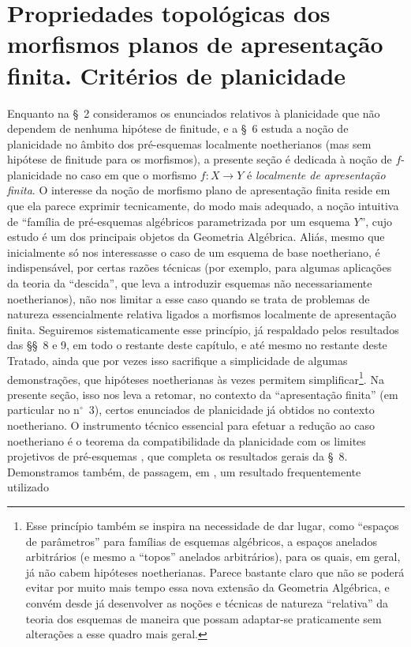 \section{Propriedades topológicas dos morfismos planos de apresentação finita. Critérios de planicidade}
\label{section:IV.11}

Enquanto na \S~2 consideramos os enunciados relativos à planicidade que não dependem de nenhuma hipótese de finitude, e a \S~6 estuda a noção de planicidade no âmbito dos pré-esquemas localmente noetherianos (mas sem hipótese de finitude para os morfismos), a presente seção é dedicada à noção de $f$-planicidade no caso em que o morfismo $f:X\to Y$ é \emph{localmente de apresentação finita}.
O interesse da noção de morfismo plano de apresentação finita reside em que ela parece exprimir tecnicamente, do modo mais adequado, a noção intuitiva de ``família de pré-esquemas algébricos parametrizada por um esquema $Y$'', cujo estudo é um dos principais objetos da Geometria Algébrica.
Aliás, mesmo que inicialmente só nos interessasse o caso de um esquema de base noetheriano, é indispensável, por certas razões técnicas (por exemplo, para algumas aplicações da teoria da ``descida'', que leva a introduzir esquemas não necessariamente noetherianos), não nos limitar a esse caso quando se trata de problemas de natureza essencialmente relativa ligados a morfismos localmente de apresentação finita.
Seguiremos sistematicamente esse princípio, já respaldado pelos resultados das \S\S~8 e 9, em todo o restante deste capítulo, e até mesmo no restante deste Tratado, ainda que por vezes isso sacrifique a simplicidade de algumas demonstrações, que hipóteses noetherianas às vezes permitem simplificar\footnote{Esse princípio também se inspira na necessidade de dar lugar, como ``espaços de parâmetros'' para famílias de esquemas algébricos, a espaços anelados arbitrários (e mesmo a ``topos'' anelados arbitrários), para os quais, em geral, já não cabem hipóteses noetherianas. Parece bastante claro que não se poderá evitar por muito mais tempo essa nova extensão da Geometria Algébrica, e convém desde já desenvolver as noções e técnicas de natureza ``relativa'' da teoria dos esquemas de maneira que possam adaptar-se praticamente sem alterações a esse quadro mais geral.}.
Na presente seção, isso nos leva a retomar, no contexto da ``apresentação finita'' (em particular no n$^\circ$~3), certos enunciados de planicidade já obtidos no contexto noetheriano.
O instrumento técnico essencial para efetuar a redução ao caso noetheriano é o teorema da compatibilidade da planicidade com os limites projetivos de pré-esquemas , que completa os resultados gerais da \S~8.
Demonstramos também, de passagem, em , um resultado frequentemente utilizado

